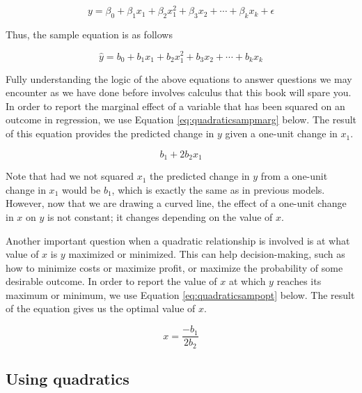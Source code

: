 \documentclass[
]{book}
\begin{document}
\begin{equation}
y = \beta_0 + \beta_1x_1 + \beta_2x_1^2 + \beta_3x_2 + \cdots + \beta_kx_k + \epsilon
\label{eq:quadratic}
\end{equation}

Thus, the sample equation is as follows

\begin{equation}
\hat{y} = b_0 + b_1x_1 + b_2x_1^2 + b_3x_2 + \cdots + b_kx_k
\label{eq:quadraticsamp}
\end{equation}

Fully understanding the logic of the above equations to answer questions we may encounter as we have done before involves calculus that this book will spare you. In order to report the marginal effect of a variable that has been squared on an outcome in regression, we use Equation \eqref{eq:quadraticsampmarg} below. The result of this equation provides the predicted change in \(y\) given a one-unit change in \(x_1\).

\begin{equation}
b_1 + 2b_2x_1
\label{eq:quadraticsampmarg}
\end{equation}

Note that had we not squared \(x_1\) the predicted change in \(y\) from a one-unit change in \(x_1\) would be \(b_1\), which is exactly the same as in previous models. However, now that we are drawing a curved line, the effect of a one-unit change in \(x\) on \(y\) is not constant; it changes depending on the value of \(x\).

Another important question when a quadratic relationship is involved is at what value of \(x\) is \(y\) maximized or minimized. This can help decision-making, such as how to minimize costs or maximize profit, or maximize the probability of some desirable outcome. In order to report the value of \(x\) at which \(y\) reaches its maximum or minimum, we use Equation \eqref{eq:quadraticsampopt} below. The result of the equation gives us the optimal value of \(x\).

\begin{equation}
x = {\frac{-b_1}{2b_2}}
\label{eq:quadraticsampopt}
\end{equation}

\hypertarget{using-quadratics}{%
\subsection{Using quadratics}\label{using-quadratics}}
\end{document}
